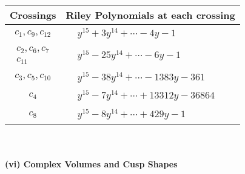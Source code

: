 \documentclass[1p]{elsarticle_modified}
\theoremstyle{definition}
\begin{document}
\begin{tabular}{m{50pt}|m{274pt}}
Crossings & \hspace{64pt}Riley Polynomials at each crossing \\
\hline $$\begin{aligned}c_{1},c_{9},c_{12}\end{aligned}$$&$\begin{aligned}
&y^{15}+3 y^{14}+\cdots-4 y-1
\end{aligned}$\\
\hline $$\begin{aligned}c_{2},c_{6},c_{7}\\c_{11}\end{aligned}$$&$\begin{aligned}
&y^{15}-25 y^{14}+\cdots-6 y-1
\end{aligned}$\\
\hline $$\begin{aligned}c_{3},c_{5},c_{10}\end{aligned}$$&$\begin{aligned}
&y^{15}-38 y^{14}+\cdots-1383 y-361
\end{aligned}$\\
\hline $$\begin{aligned}c_{4}\end{aligned}$$&$\begin{aligned}
&y^{15}-7 y^{14}+\cdots+13312 y-36864
\end{aligned}$\\
\hline $$\begin{aligned}c_{8}\end{aligned}$$&$\begin{aligned}
&y^{15}-8 y^{14}+\cdots+429 y-1
\end{aligned}$\\
\hline
\end{tabular}\\~\\
\newpage\flushleft \textbf{(vi) Complex Volumes and Cusp Shapes}
\end{document}

